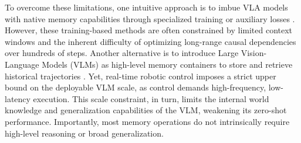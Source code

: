 

To overcome these limitations, one intuitive approach is to imbue VLA models with native memory capabilities through specialized training or auxiliary losses \cite{Torne2025LearningLD,Fang2025SAM2ActIV}. However, these training-based methods are often constrained by limited context windows and the inherent difficulty of optimizing long-range causal dependencies over hundreds of steps. Another alternative is to introduce Large Vision-Language Models (VLMs) as high-level memory containers to store and retrieve historical trajectories \cite{Sridhar2025MemERSU}. Yet, real-time robotic control imposes a strict upper bound on the deployable VLM scale, as control demands high-frequency, low-latency execution. This scale constraint, in turn, limits the internal world knowledge and generalization capabilities of the VLM, weakening its zero-shot performance. Importantly, most memory operations do not intrinsically require high-level reasoning or broad generalization. 

